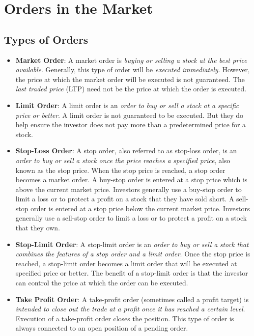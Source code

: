 \section{Orders in the Market}
\subsection{Types of Orders}

\begin{itemize}
  \item \textbf{Market Order}: A market order is \emph{buying or selling a stock at the best price available}. Generally, this type of order will be \emph{executed immediately}. However, the price at which the market order will be executed is not guaranteed. The \textit{last traded price} (LTP) need not be the price at which the order is executed.
  \item \textbf{Limit Order}: A limit order is an \emph{order to buy or sell a stock at a specific price or better}.  A limit order is not guaranteed to be executed. But they do help ensure the investor does not pay more than a predetermined price for a stock.
  \item \textbf{Stop-Loss Order}: A stop order, also referred to as stop-loss order, is an \emph{order to buy or sell a stock once the price reaches a specified price}, also known as the stop price. When the stop price is reached, a stop order becomes a market order. A buy-stop order is entered at a stop price which is above the current market price. Investors generally use a buy-stop order to limit a loss or to protect a profit on a stock that they have sold short. A sell-stop order is entered at a stop price below the current market price. Investors generally use a sell-stop order to limit a loss or to protect a profit on a stock that they own.
  \item \textbf{Stop-Limit Order}: A stop-limit order is an \emph{order to buy or sell a stock that combines the features of a stop order and a limit order}. Once the stop price is reached, a stop-limit order becomes a limit order that will be executed at specified price or better. The benefit of a stop-limit order is that the investor can control the price at which the order can be executed.
  \item \textbf{Take Profit Order}: A take-profit order (sometimes called a profit target) is \emph{intended to close out the trade at a profit once it has reached a certain level}. Execution of a take-profit order closes the position. This type of order is always connected to an open position of a pending order.
\end{itemize}


